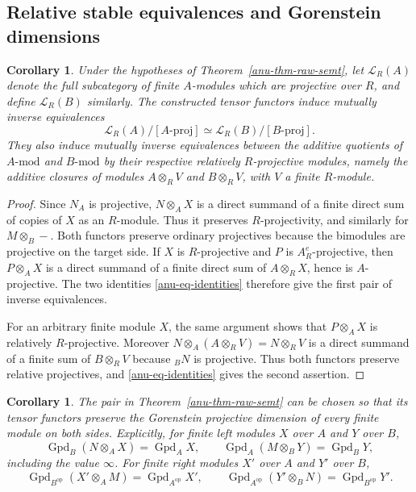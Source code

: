 \documentclass[12pt,a4paper,english,reqno]{amsart}
\numberwithin{equation}{section}
\theoremstyle{plain}
\newtheorem{corollary}[theorem]{Corollary}
\theoremstyle{definition}
\begin{document}
\subsection{Relative stable equivalences and Gorenstein dimensions}

\begin{corollary}\label{anu-cor-relative}
Under the hypotheses of Theorem~\ref{anu-thm-raw-semt}, let
$\mathcal L_R(A)$ denote the full subcategory of finite $A$-modules
which are projective over $R$, and define $\mathcal L_R(B)$ similarly.
The constructed tensor functors induce mutually inverse equivalences
\[
 \mathcal L_R(A)/[A\text{-}\mathrm{proj}]
 \simeq
 \mathcal L_R(B)/[B\text{-}\mathrm{proj}].
\]
They also induce mutually inverse equivalences between the additive
quotients of $A\text{-}\mathrm{mod}$ and $B\text{-}\mathrm{mod}$ by
their respective relatively $R$-projective modules, namely the
additive closures of modules $A\otimes_RV$ and $B\otimes_RV$,
with $V$ a finite $R$-module.
\end{corollary}

\begin{proof}
Since $N_A$ is projective, $N\otimes_AX$ is a direct summand of
a finite direct sum of copies of $X$ as an $R$-module.  Thus it
preserves $R$-projectivity, and similarly for $M\otimes_B-$.
Both functors preserve ordinary projectives because the bimodules
are projective on the target side.  If $X$ is $R$-projective and $P$ is
$A_R^e$-projective, then $P\otimes_AX$ is a direct summand of a
finite direct sum of $A\otimes_RX$, hence is $A$-projective.
The two identities \eqref{anu-eq-identities} therefore give the
first pair of inverse equivalences.

For an arbitrary finite module $X$, the same argument shows that
$P\otimes_AX$ is relatively $R$-projective.
Moreover $N\otimes_A(A\otimes_RV)=N\otimes_RV$ is a direct
summand of a finite sum of $B\otimes_RV$ because ${}_BN$ is
projective.  Thus both functors preserve relative projectives, and
\eqref{anu-eq-identities} gives the second assertion.
\end{proof}

\begin{corollary}\label{anu-cor-gpd}
The pair in Theorem~\ref{anu-thm-raw-semt} can be chosen so that
its tensor functors preserve the Gorenstein projective dimension
of every finite module on both sides.  Explicitly, for finite
left modules $X$ over $A$ and $Y$ over $B$,
\[
 \operatorname{Gpd}_B(N\otimes_AX)=\operatorname{Gpd}_A X,
 \qquad
 \operatorname{Gpd}_A(M\otimes_BY)=\operatorname{Gpd}_B Y,
\]
including the value $\infty$.  For finite right modules $X'$ over
$A$ and $Y'$ over $B$,
\[
 \operatorname{Gpd}_{B^{\mathrm{op}}}(X'\otimes_AM)
 =\operatorname{Gpd}_{A^{\mathrm{op}}}X',
 \qquad
 \operatorname{Gpd}_{A^{\mathrm{op}}}(Y'\otimes_BN)
 =\operatorname{Gpd}_{B^{\mathrm{op}}}Y'.
\]
\end{corollary}
\end{document}
